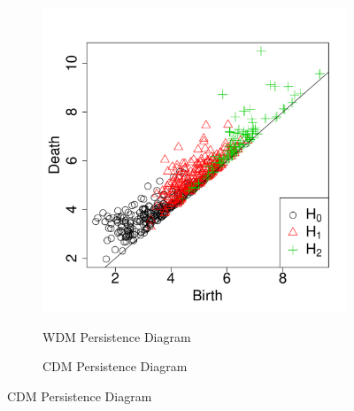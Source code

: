 \documentclass[12pt]{article}
\begin{document}
\begin{figure}[htp!]
  \centering
  \begin{subfigure}{0.45\textwidth}
    \caption{WDM Persistence Diagram}
    \includegraphics[width=\linewidth]{figure_11_wdm_pd.pdf}
    \label{fig:eagleDiagsD}
  \end{subfigure}
  \begin{subfigure}{0.45\textwidth}
    \caption{CDM Persistence Diagram}

\end{subfigure}
\end{figure}
\end{document}
